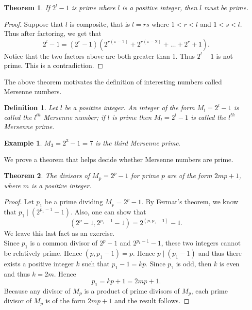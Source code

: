 \documentclass[12pt,letterpaper]{book}
\newtheorem{definition}{Definition}
\newtheorem{theorem}{Theorem}
\newtheorem{example}{Example}
\begin{document}
\begin{theorem}
If $2^l-1$ is prime where $l$ is a positive integer, then $l$ must
be prime.
\end{theorem}

\begin{proof}
Suppose that $l$ is composite, that is $l=rs$ where $1<r<l$ and
$1<s<l$.  Thus after factoring, we get that
\begin{equation*}
2^l-1=(2^r-1)(2^{r(s-1)}+2^{r(s-2)}+...+2^{r}+1).
\end{equation*}
Notice that the two factors above are both greater than 1.  Thus
$2^l-1$ is not prime.  This is a contradiction.
\end{proof}
The above theorem motivates the definition of interesting numbers
called Mersenne numbers.  
\begin{definition}
Let $l$ be a positive integer.  An integer of the form $M_l=2^l-1$
is called the $l^{th}$ Mersenne number; if $l$ is prime then
$M_l=2^l-1$ is called the $l^{th}$ Mersenne prime.
\end{definition}

\begin{example}
$M_3=2^3-1=7$ is the third Mersenne prime.
\end{example}

We prove a theorem that helps decide whether Mersenne numbers are
prime.

\begin{theorem}
The divisors of $M_p=2^p-1$ for prime $p$ are of the form $2mp+1$, where
$m$ is a positive integer.
\end{theorem}

\begin{proof}
Let $p_1$ be a prime dividing $M_p=2^p-1$.  By Fermat's theorem, we
know that $p_1\mid (2^{p_1-1}-1)$.  Also, one can show that
\begin{equation*}
(2^{p}-1,2^{p_1-1}-1)=2^{(p,p_1-1)}-1.
\end{equation*}
We leave this last fact as an exercise.\\  Since $p_1$ is a common divisor of $2^p-1$ and $2^{p_1-1}-1$, these two integers cannot be relatively prime.  Hence $(p,p_1-1)=p$.  Hence $p\mid
(p_1-1)$ and thus there exists a positive integer $k$ such that
$p_1-1=kp$. Since $p_1$ is odd, then $k$ is even and thus $k=2m$.
Hence
\begin{equation*}
p_1=kp+1=2mp+1.
\end{equation*}
Because any divisor of $M_p$ is a product of prime divisors of
$M_p$, each prime divisor of $M_p$ is of the form $2mp+1$ and the
result follows.
\end{proof}
\end{document}
